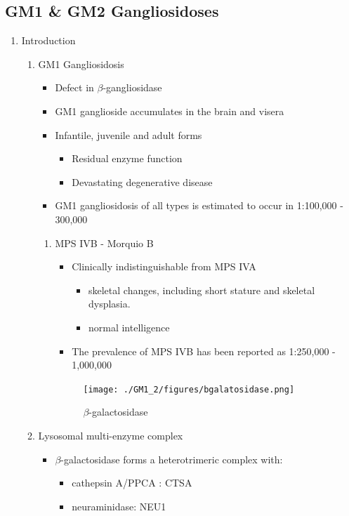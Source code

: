 \documentclass{scrartcl}
\begin{document}
\subsection{GM1 \& GM2 Gangliosidoses}
\label{sec:org9f5c443}
\begin{enumerate}
\item Introduction
\label{sec:orgafff816}
\begin{enumerate}
\item GM1 Gangliosidosis
\label{sec:orgf43ba9e}
\begin{itemize}
\item Defect in \(\beta\)-gangliosidase
\item GM1 ganglioside accumulates in the brain and visera
\item Infantile, juvenile and adult forms
\begin{itemize}
\item Residual enzyme function
\item Devastating degenerative disease
\end{itemize}
\item GM1 gangliosidosis of all types is estimated to occur in 1:100,000 - 300,000
\end{itemize}

\begin{enumerate}
\item MPS IVB - Morquio B
\label{sec:org1524137}
\begin{itemize}
\item Clinically indistinguishable from MPS IVA
\begin{itemize}
\item skeletal changes, including short stature and skeletal dysplasia.
\item normal intelligence
\end{itemize}
\item The prevalence of MPS IVB has been reported as 1:250,000 - 1,000,000
\end{itemize}

\begin{figure}[htbp]
\centering
\texttt{[image: ./GM1\_2/figures/bgalatosidase.png]}
\caption{\label{fig:org3432fa9}
\(\beta\)-galactosidase}
\end{figure}
\end{enumerate}


\item Lysosomal multi-enzyme complex
\label{sec:orge6f6396}

\begin{itemize}
\item \(\beta\)-galactosidase forms a heterotrimeric complex with:
\begin{itemize}
\item cathepsin A/PPCA : CTSA
\item neuraminidase: NEU1
\end{itemize}


\end{itemize}
\end{enumerate}
\end{enumerate}
\end{document}
